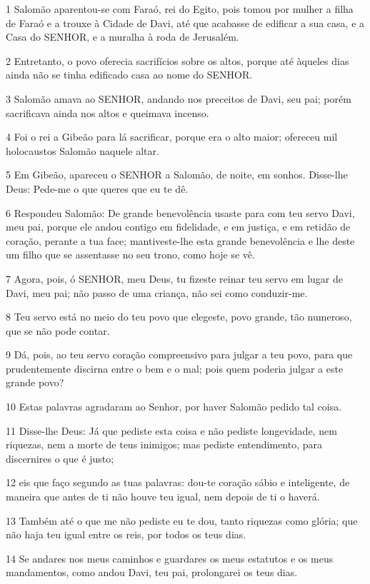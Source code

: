 \par 1 Salomão aparentou-se com Faraó, rei do Egito, pois tomou por mulher a filha de Faraó e a trouxe à Cidade de Davi, até que acabasse de edificar a sua casa, e a Casa do SENHOR, e a muralha à roda de Jerusalém.
\par 2 Entretanto, o povo oferecia sacrifícios sobre os altos, porque até àqueles dias ainda não se tinha edificado casa ao nome do SENHOR.
\par 3 Salomão amava ao SENHOR, andando nos preceitos de Davi, seu pai; porém sacrificava ainda nos altos e queimava incenso.
\par 4 Foi o rei a Gibeão para lá sacrificar, porque era o alto maior; ofereceu mil holocaustos Salomão naquele altar.
\par 5 Em Gibeão, apareceu o SENHOR a Salomão, de noite, em sonhos. Disse-lhe Deus: Pede-me o que queres que eu te dê.
\par 6 Respondeu Salomão: De grande benevolência usaste para com teu servo Davi, meu pai, porque ele andou contigo em fidelidade, e em justiça, e em retidão de coração, perante a tua face; mantiveste-lhe esta grande benevolência e lhe deste um filho que se assentasse no seu trono, como hoje se vê.
\par 7 Agora, pois, ó SENHOR, meu Deus, tu fizeste reinar teu servo em lugar de Davi, meu pai; não passo de uma criança, não sei como conduzir-me.
\par 8 Teu servo está no meio do teu povo que elegeste, povo grande, tão numeroso, que se não pode contar.
\par 9 Dá, pois, ao teu servo coração compreensivo para julgar a teu povo, para que prudentemente discirna entre o bem e o mal; pois quem poderia julgar a este grande povo?
\par 10 Estas palavras agradaram ao Senhor, por haver Salomão pedido tal coisa.
\par 11 Disse-lhe Deus: Já que pediste esta coisa e não pediste longevidade, nem riquezas, nem a morte de teus inimigos; mas pediste entendimento, para discernires o que é justo;
\par 12 eis que faço segundo as tuas palavras: dou-te coração sábio e inteligente, de maneira que antes de ti não houve teu igual, nem depois de ti o haverá.
\par 13 Também até o que me não pediste eu te dou, tanto riquezas como glória; que não haja teu igual entre os reis, por todos os teus dias.
\par 14 Se andares nos meus caminhos e guardares os meus estatutos e os meus mandamentos, como andou Davi, teu pai, prolongarei os teus dias.
